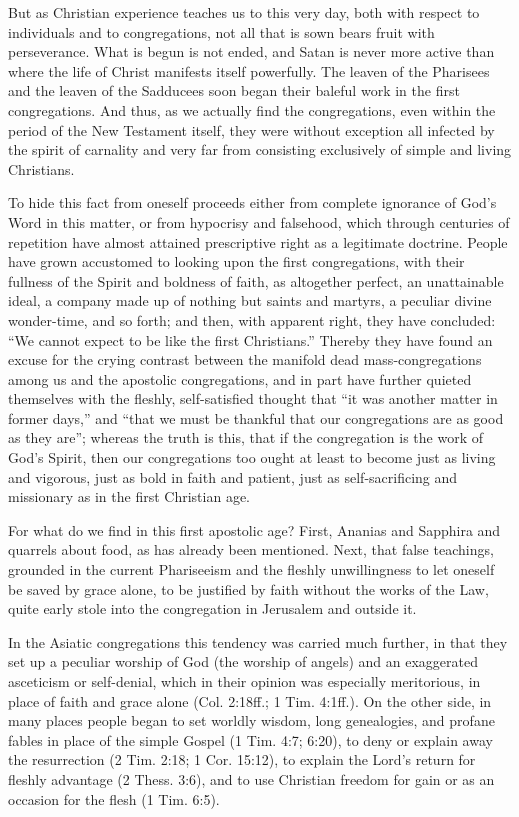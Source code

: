 But as Christian experience teaches us to this very day, both with respect to individuals and to congregations, not all that is sown bears fruit with perseverance. What is begun is not ended, and Satan is never more active than where the life of Christ manifests itself powerfully. The leaven of the Pharisees and the leaven of the Sadducees soon began their baleful work in the first congregations. And thus, as we actually find the congregations, even within the period of the New Testament itself, they were without exception all infected by the spirit of carnality and very far from consisting exclusively of simple and living Christians.

To hide this fact from oneself proceeds either from complete ignorance of God’s Word in this matter, or from hypocrisy and falsehood, which through centuries of repetition have almost attained prescriptive right as a legitimate doctrine. People have grown accustomed to looking upon the first congregations, with their fullness of the Spirit and boldness of faith, as altogether perfect, an unattainable ideal, a company made up of nothing but saints and martyrs, a peculiar divine wonder-time, and so forth; and then, with apparent right, they have concluded: “We cannot expect to be like the first Christians.” Thereby they have found an excuse for the crying contrast between the manifold dead mass-congregations among us and the apostolic congregations, and in part have further quieted themselves with the fleshly, self-satisfied thought that “it was another matter in former days,” and “that we must be thankful that our congregations are as good as they are”; whereas the truth is this, that if the congregation is the work of God’s Spirit, then our congregations too ought at least to become just as living and vigorous, just as bold in faith and patient, just as self-sacrificing and missionary as in the first Christian age.

For what do we find in this first apostolic age? First, Ananias and Sapphira and quarrels about food, as has already been mentioned. Next, that false teachings, grounded in the current Phariseeism and the fleshly unwillingness to let oneself be saved by grace alone, to be justified by faith without the works of the Law, quite early stole into the congregation in Jerusalem and outside it.

In the Asiatic congregations this tendency was carried much further, in that they set up a peculiar worship of God (the worship of angels) and an exaggerated asceticism or self-denial, which in their opinion was especially meritorious, in place of faith and grace alone (Col. 2:18ff.; 1 Tim. 4:1ff.). On the other side, in many places people began to set worldly wisdom, long genealogies, and profane fables in place of the simple Gospel (1 Tim. 4:7; 6:20), to deny or explain away the resurrection (2 Tim. 2:18; 1 Cor. 15:12), to explain the Lord’s return for fleshly advantage (2 Thess. 3:6), and to use Christian freedom for gain or as an occasion for the flesh (1 Tim. 6:5).

